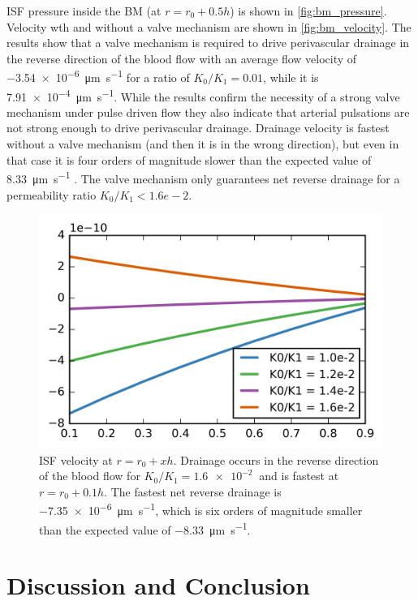 \documentclass[a4paper,titlepage]{scrartcl}
\begin{document}
ISF pressure inside the BM (at $r = r_0 + 0.5h$) is shown in \autoref{fig:bm_pressure}. Velocity wth and without a valve mechanism are shown in \autoref{fig:bm_velocity}. The results show that a valve mechanism is required to drive perivascular drainage in the reverse direction of the blood flow with an average flow velocity of \SI{-3.54e-6}{\micro\metre\per\second} for a ratio of $K_0/K_1 = 0.01$, while it is \SI{7.91e-4}{\micro\metre\per\second}. While the results confirm the necessity of a strong valve mechanism under pulse driven flow they also indicate that arterial pulsations are not strong enough to drive perivascular drainage. Drainage velocity is fastest without a valve mechanism (and then it is in the wrong direction), but even in that case it is four orders of magnitude slower than the expected value of \SI{8.33}{\micro\metre\per\second} \cite{Carare2008}. The valve mechanism only guarantees net reverse drainage for a permeability ratio $K_0/K_1 < 1.6e-2$.

\begin{figure}
\centerline{\includegraphics{figures/valve_test.png}}
\caption{ISF velocity at $r = r_0 + xh$. Drainage occurs in the reverse direction of the blood flow for $K_0/K_1 = \SI{1.6e-2}{}$ and is fastest at $r = r_0 + 0.1h$. The fastest net reverse drainage is \SI{-7.35e-6}{\micro\metre\per\second}, which is six orders of magnitude smaller than the expected value of \SI{-8.33}{\micro\metre\per\second}.\label{fig:valve_test}}
\end{figure}


\section{Discussion and Conclusion}
\end{document}
